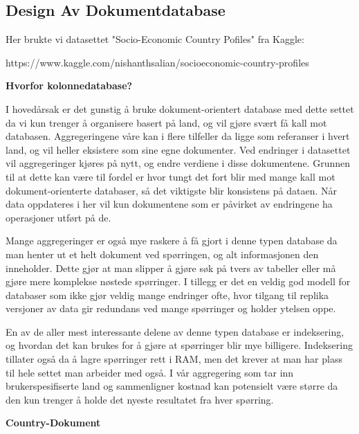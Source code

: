 \subsection{Design Av Dokumentdatabase}
Her brukte vi datasettet "Socio-Economic Country Pofiles" fra Kaggle:

https://www.kaggle.com/nishanthsalian/socioeconomic-country-profiles


\textbf{Hvorfor kolonnedatabase?}

I hovedårsak er det gunstig å bruke dokument-orientert database med dette settet da vi kun trenger å organisere basert på land, og vil gjøre svært få kall mot databasen. Aggregeringene våre kan i flere tilfeller da ligge som referanser i hvert land, og vil heller eksistere som sine egne dokumenter. Ved endringer i datasettet vil aggregeringer kjøres på nytt, og endre verdiene i disse dokumentene. Grunnen til at dette kan være til fordel er hvor tungt det fort blir med mange kall mot dokument-orienterte databaser, så det viktigste blir konsistens på dataen. Når data oppdateres i her vil kun dokumentene som er påvirket av endringene ha operasjoner utført på de.

Mange aggregeringer er også mye raskere å få gjort i denne typen database da man henter ut et helt dokument ved spørringen, og alt informasjonen den inneholder. Dette gjør at man slipper å gjøre søk på tvers av tabeller eller må gjøre mere komplekse nøstede spørringer. I tillegg er det en veldig god modell for databaser som ikke gjør veldig mange endringer ofte, hvor tilgang til replika versjoner av data gir redundans ved mange spørringer og holder ytelsen oppe.

En av de aller mest interessante delene av denne typen database er indeksering, og hvordan det kan brukes for å gjøre at spørringer blir mye billigere. Indeksering tillater også da å lagre spørringer rett i RAM, men det krever at man har plass til hele settet man arbeider med også. I vår aggregering som tar inn brukerspesifiserte land og sammenligner kostnad kan potensielt være større da den kun trenger å holde det nyeste resultatet fra hver spørring.

\textbf{Country-Dokument}

